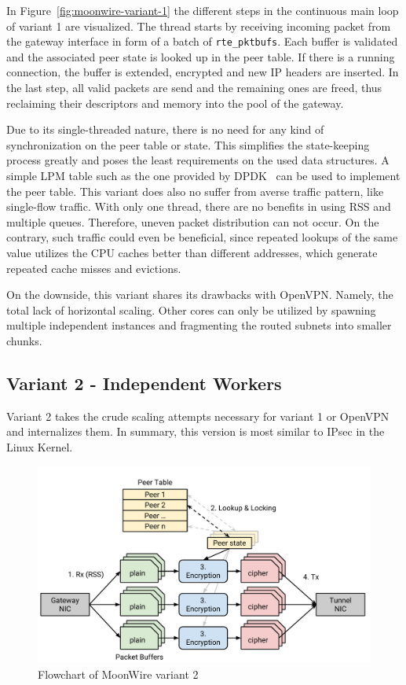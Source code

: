 In Figure~\ref{fig:moonwire-variant-1} the different steps in the continuous main loop of variant 1 are visualized. The thread starts by receiving incoming packet from the gateway interface in form of a batch of \texttt{rte\_pktbufs}. Each buffer is validated and the associated peer state is looked up in the peer table. If there is a running connection, the buffer is extended, encrypted and new IP headers are inserted. In the last step, all valid packets are send and the remaining ones are freed, thus reclaiming their descriptors and memory into the pool of the gateway.

Due to its single-threaded nature, there is no need for any kind of synchronization on the peer table or state. This simplifies the state-keeping process greatly and poses the least requirements on the used data structures. A simple LPM table such as the one provided by DPDK~\cite{dpdk-lpm-api} can be used to implement the peer table.
This variant does also no suffer from averse traffic pattern, like single-flow traffic. With only one thread, there are no benefits in using RSS and multiple queues. Therefore, uneven packet distribution can not occur. On the contrary, such traffic could even be beneficial, since repeated lookups of the same value utilizes the CPU caches better than different addresses, which generate repeated cache misses and evictions.

On the downside, this variant shares its drawbacks with OpenVPN. Namely, the total lack of horizontal scaling. Other cores can only be utilized by spawning multiple independent instances and fragmenting the routed subnets into smaller chunks.


\subsection{Variant 2 - Independent Workers}
Variant 2 takes the crude scaling attempts necessary for variant 1 or OpenVPN and internalizes them. In summary, this version is most similar to IPsec in the Linux Kernel.

\begin{figure}[h]
	\centering
	\includegraphics[width=0.9\linewidth]{figures/moonwire-variant-2}
	\caption{Flowchart of MoonWire variant 2}
	\label{fig:moonwire-variant-2}
\end{figure}

